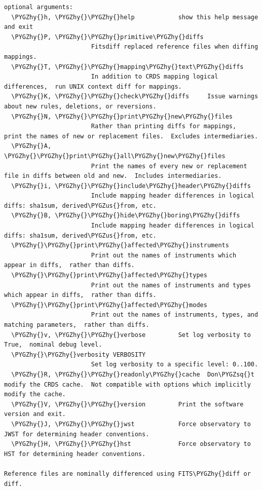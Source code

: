 \documentclass[letterpaper,10pt,english]{sphinxmanual}
\def\PYGZus{\char`\_}
\def\PYGZhy{\char`\-}
\def\PYGZsq{\char`\'}
\begin{document}
\begin{Verbatim}[commandchars=\\\{\}]
optional arguments:
  \PYGZhy{}h, \PYGZhy{}\PYGZhy{}help            show this help message and exit
  \PYGZhy{}P, \PYGZhy{}\PYGZhy{}primitive\PYGZhy{}diffs
                        Fitsdiff replaced reference files when diffing mappings.
  \PYGZhy{}T, \PYGZhy{}\PYGZhy{}mapping\PYGZhy{}text\PYGZhy{}diffs
                        In addition to CRDS mapping logical differences,  run UNIX context diff for mappings.
  \PYGZhy{}K, \PYGZhy{}\PYGZhy{}check\PYGZhy{}diffs     Issue warnings about new rules, deletions, or reversions.
  \PYGZhy{}N, \PYGZhy{}\PYGZhy{}print\PYGZhy{}new\PYGZhy{}files
                        Rather than printing diffs for mappings,  print the names of new or replacement files.  Excludes intermediaries.
  \PYGZhy{}A, \PYGZhy{}\PYGZhy{}print\PYGZhy{}all\PYGZhy{}new\PYGZhy{}files
                        Print the names of every new or replacement file in diffs between old and new.  Includes intermediaries.
  \PYGZhy{}i, \PYGZhy{}\PYGZhy{}include\PYGZhy{}header\PYGZhy{}diffs
                        Include mapping header differences in logical diffs: sha1sum, derived\PYGZus{}from, etc.
  \PYGZhy{}B, \PYGZhy{}\PYGZhy{}hide\PYGZhy{}boring\PYGZhy{}diffs
                        Include mapping header differences in logical diffs: sha1sum, derived\PYGZus{}from, etc.
  \PYGZhy{}\PYGZhy{}print\PYGZhy{}affected\PYGZhy{}instruments
                        Print out the names of instruments which appear in diffs,  rather than diffs.
  \PYGZhy{}\PYGZhy{}print\PYGZhy{}affected\PYGZhy{}types
                        Print out the names of instruments and types which appear in diffs,  rather than diffs.
  \PYGZhy{}\PYGZhy{}print\PYGZhy{}affected\PYGZhy{}modes
                        Print out the names of instruments, types, and matching parameters,  rather than diffs.
  \PYGZhy{}v, \PYGZhy{}\PYGZhy{}verbose         Set log verbosity to True,  nominal debug level.
  \PYGZhy{}\PYGZhy{}verbosity VERBOSITY
                        Set log verbosity to a specific level: 0..100.
  \PYGZhy{}R, \PYGZhy{}\PYGZhy{}readonly\PYGZhy{}cache  Don\PYGZsq{}t modify the CRDS cache.  Not compatible with options which implicitly modify the cache.
  \PYGZhy{}V, \PYGZhy{}\PYGZhy{}version         Print the software version and exit.
  \PYGZhy{}J, \PYGZhy{}\PYGZhy{}jwst            Force observatory to JWST for determining header conventions.
  \PYGZhy{}H, \PYGZhy{}\PYGZhy{}hst             Force observatory to HST for determining header conventions.

Reference files are nominally differenced using FITS\PYGZhy{}diff or diff.


\end{Verbatim}
\end{document}
